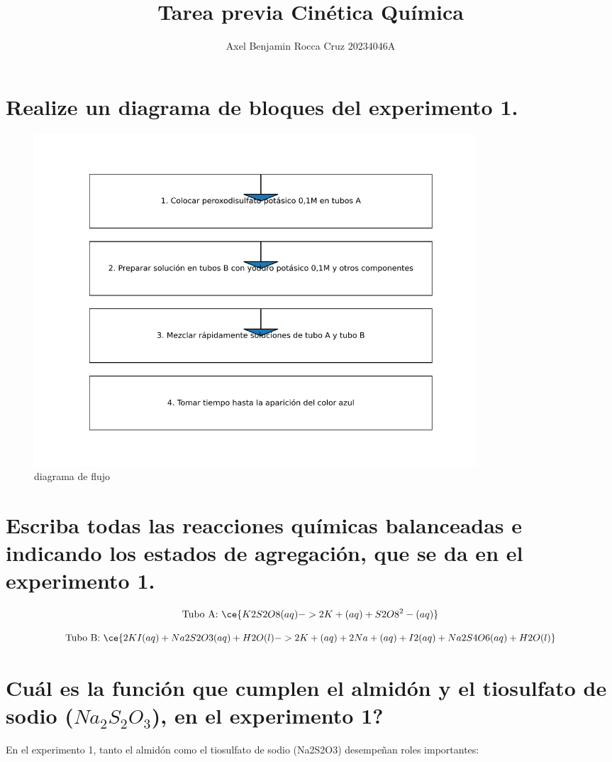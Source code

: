 \documentclass[11pt]{scrartcl}
\author{Axel Benjamin Rocca Cruz 20234046A}
\title{Tarea previa Cin\'etica Qu\'imica}
\begin{document}
\maketitle
\section{Realize un diagrama de bloques del experimento 1.}

\begin{figure}[H]
\begin{center}
	\caption{diagrama de flujo}
	\includegraphics[width=0.8\textwidth]{diagrama_flujo.png}
\end{center}
\end{figure}

\section{Escriba todas las reacciones químicas balanceadas e indicando los estados de agregación, que se da en el experimento 1.}


\begin{equation}
\text{Tubo A: } \ce{K2S2O8(aq) -> 2K+(aq) + S2O8^2-(aq)}
\end{equation}

\begin{equation}
\text{Tubo B: } \ce{2KI(aq) + Na2S2O3(aq) + H2O(l) -> 2K+(aq) + 2Na+(aq) + I2(aq) + Na2S4O6(aq) + H2O(l)}
\end{equation}



\section{Cu\'al es la funci\'on que cumplen el almid\'on y el tiosulfato de sodio ($Na_{2} S_{2} O_{3}$), en el experimento 1?}
En el experimento 1, tanto el almidón como el tiosulfato de sodio (Na2S2O3) desempeñan roles importantes:
\end{document}
